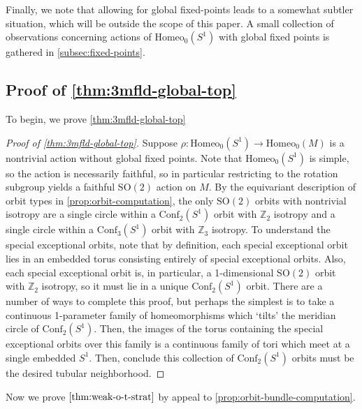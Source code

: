 \documentclass[10pt, oneside]{article}
\newcommand{\Z}{\mathbb{Z}}
\newcommand{\SO}[1][2]{\text{SO}(#1)}
\newcommand{\homeo}[1][S^1]{\text{Homeo}_0(#1)}
\newcommand{\conf}[2][S^1]{\text{Conf}_{#2}(#1)}
\theoremstyle{definition}
\theoremstyle{definition}
\begin{document}
Finally, we note that allowing for global fixed-points leads to a somewhat subtler situation, which will be outside the scope of this paper. A small collection of observations concerning actions of $\homeo$ with global fixed points is gathered in \cref{subsec:fixed-points}.

\subsection{Proof of \texorpdfstring{\cref{thm:3mfld-global-top}}{Theorem \ref*{thm:3mfld-global-top}}}
To begin, we prove \cref{thm:3mfld-global-top}
\begin{proof}[Proof of  \cref{thm:3mfld-global-top}]
    Suppose $\rho: \homeo \to \homeo[M]$ is a nontrivial action without global fixed points. Note that $\homeo$ is simple, so the action is necessarily faithful, so in particular restricting to the rotation subgroup yields a faithful $\text{SO}(2)$ action on $M$. By the equivariant description of orbit types in \cref{prop:orbit-computation}, the only $\text{SO}(2)$ orbits with nontrivial isotropy are a single circle within a $\conf[S^1]{2}$ orbit with $\Z_2$ isotropy and a single circle within a $\conf[S^1]{3}$ orbit with $\Z_3$ isotropy. To understand the special exceptional orbits, note that by definition, each special exceptional orbit lies in an embedded torus consisting entirely of special exceptional orbits. Also, each special exceptional orbit is, in particular, a 1-dimensional $\SO[2]$ orbit with $\Z_2$ isotropy, so it must lie in a unique $\conf[S^1]{2}$ orbit. There are a number of ways to complete this proof, but perhaps the simplest is to take a continuous 1-parameter family of homeomorphisms which `tilts' the meridian circle of $\conf[S^1]{2}$. Then, the images of the torus containing the special exceptional orbits over this family is a continuous family of tori which meet at a single embedded $S^1$. Then, conclude this collection of $\conf[S^1]{2}$ orbits must be the desired tubular neighborhood.
\end{proof}

Now we prove $\cref{thm:weak-o-t-strat}$ by appeal to \cref{prop:orbit-bundle-computation}.
\end{document}
